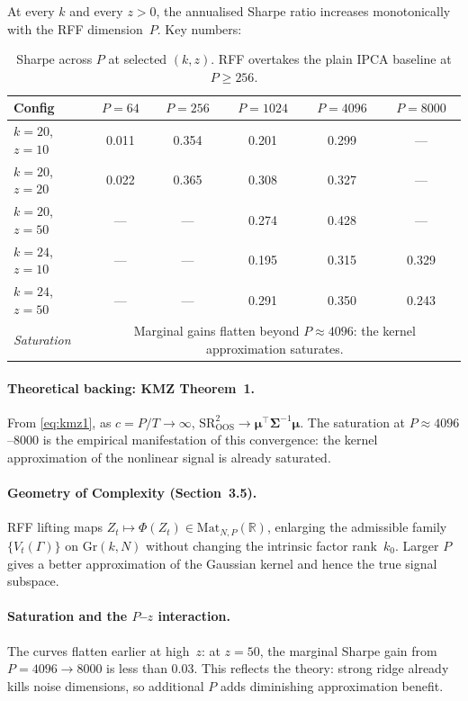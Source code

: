 \documentclass[11pt,a4paper]{article}
\begin{document}
At every $k$ and every $z > 0$, the annualised Sharpe ratio increases monotonically with the RFF dimension~$P$.  Key numbers:

\begin{table}[H]
\centering\small
\begin{tabular}{lccccc}
\toprule
Config & $P = 64$ & $P = 256$ & $P = 1024$ & $P = 4096$ & $P = 8000$ \\
\midrule
$k = 20$, $z = 10$ & 0.011 & 0.354 & 0.201 & 0.299 & --- \\
$k = 20$, $z = 20$ & 0.022 & 0.365 & 0.308 & 0.327 & --- \\
$k = 20$, $z = 50$ & --- & --- & 0.274 & 0.428 & --- \\
$k = 24$, $z = 10$ & --- & --- & 0.195 & 0.315 & 0.329 \\
$k = 24$, $z = 50$ & --- & --- & 0.291 & 0.350 & 0.243 \\
\midrule
\textit{Saturation} & \multicolumn{5}{c}{Marginal gains flatten beyond $P \approx 4096$: the kernel approximation saturates.} \\
\bottomrule
\end{tabular}
\caption{Sharpe across $P$ at selected $(k, z)$.  RFF overtakes the plain IPCA baseline at $P \geq 256$.}
\label{tab:voc}
\end{table}

\paragraph{Theoretical backing: KMZ Theorem~1.}
From \eqref{eq:kmz1}, as $c = P/T \to \infty$, $\mathrm{SR}^2_{\mathrm{OOS}} \to \boldsymbol\mu^\top \boldsymbol\Sigma^{-1}\boldsymbol\mu$.  The saturation at $P \approx 4096$--$8000$ is the empirical manifestation of this convergence: the kernel approximation of the nonlinear signal is already saturated.

\paragraph{Geometry of Complexity (Section~3.5).}
RFF lifting maps $Z_t \mapsto \Phi(Z_t) \in \mathrm{Mat}_{N,P}(\mathbb{R})$, enlarging the admissible family $\{V_t(\Gamma)\}$ on $\mathrm{Gr}(k, N)$ without changing the intrinsic factor rank~$k_0$.  Larger $P$ gives a better approximation of the Gaussian kernel and hence the true signal subspace.

\paragraph{Saturation and the $P$--$z$ interaction.}
The curves flatten earlier at high~$z$: at $z = 50$, the marginal Sharpe gain from $P = 4096 \to 8000$ is less than $0.03$.  This reflects the theory: strong ridge already kills noise dimensions, so additional $P$ adds diminishing approximation benefit.
\end{document}

